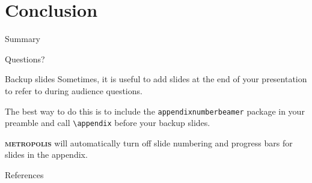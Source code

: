 \documentclass[10pt]{beamer}
\newcommand{\themename}{\textbf{\textsc{metropolis}}\xspace}
\begin{document}
\section{Conclusion}

\begin{frame}[fragile]{Summary} 

  \begin{itemize}

\end{itemize}



\end{frame}

{
\begin{frame}[standout]
  Questions?
\end{frame}
}

\appendix

\begin{frame}[fragile]{Backup slides}
  Sometimes, it is useful to add slides at the end of your presentation to
  refer to during audience questions.

  The best way to do this is to include the \verb|appendixnumberbeamer|
  package in your preamble and call \verb|\appendix| before your backup slides.

  \themename will automatically turn off slide numbering and progress bars for
  slides in the appendix.
\end{frame}

\begin{frame}[allowframebreaks]{References}
  \footnotesize
  
  
\end{frame}
\end{document}

